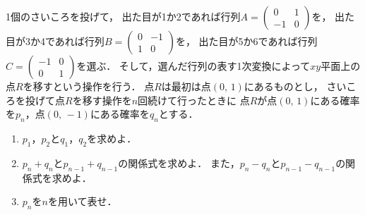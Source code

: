 \documentclass[../../main.tex]{subfiles}
\begin{document}
1個のさいころを投げて，
出た目が1か2であれば行列$A=
\begin{pmatrix} 0 & 1 \\ -1 & 0
\end{pmatrix}$を，
出た目が3か4であれば行列$B=
\begin{pmatrix} 0 & -1 \\ 1 & 0
\end{pmatrix}$を，
出た目が5か6であれば行列$C=
\begin{pmatrix} -1 & 0 \\ 0 & 1
\end{pmatrix}$を選ぶ．
そして，選んだ行列の表す1次変換によって$xy$平面上の点$R$を移すという操作を行う．
点$R$は最初は点$(0, \, 1)$にあるものとし，
さいころを投げて点$R$を移す操作を$n$回続けて行ったときに
点$R$が点$(0, \, 1)$にある確率を$p_n$，点$(0, \, -1)$にある確率を$q_n$とする．
\begin{enumerate}
  \item $p_1$，$p_2$と$q_1$，$q_2$を求めよ．
  \item $p_n+q_n$と$p_{n-1}+q_{n-1}$の関係式を求めよ．
    また，$p_n-q_n$と$p_{n-1}-q_{n-1}$の関係式を求めよ．
  \item $p_n$を$n$を用いて表せ．
\end{enumerate}
\end{document}
